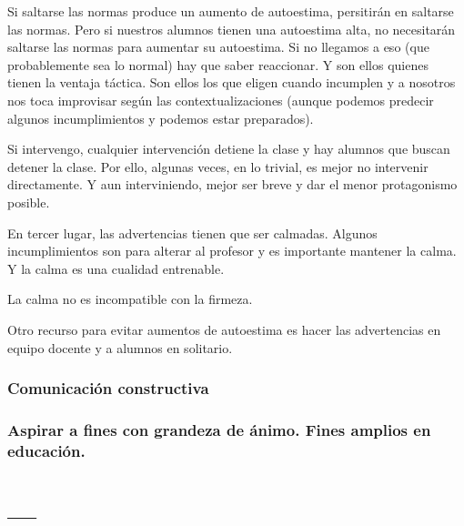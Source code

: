 \documentclass[palatino]{apuntesURJC}
\begin{document}
Si saltarse las normas produce un aumento de autoestima, persitirán en saltarse las normas.
%
Pero si nuestros alumnos tienen una autoestima alta, no necesitarán saltarse las normas para aumentar su autoestima.
%
Si no llegamos a eso (que probablemente sea lo normal) hay que saber reaccionar.
%
Y son ellos quienes tienen la ventaja táctica. Son ellos los que eligen cuando incumplen y a nosotros nos toca improvisar según las contextualizaciones (aunque podemos predecir algunos incumplimientos y podemos estar preparados).

Si intervengo, cualquier intervención detiene la clase y hay alumnos que buscan detener la clase. 
%
Por ello, algunas veces, en lo trivial, es mejor no intervenir directamente.
%
Y aun interviniendo, mejor ser breve y dar el menor protagonismo posible.

En tercer lugar, las advertencias tienen que ser calmadas. 
%
Algunos incumplimientos son para alterar al profesor y es importante mantener la calma. 
%
Y la calma es una cualidad entrenable.

La calma no es incompatible con la firmeza.

Otro recurso para evitar aumentos de autoestima es hacer las advertencias en equipo docente y a alumnos en solitario.



\subsection{Comunicación constructiva}

\subsection{Aspirar a fines con grandeza de ánimo. Fines amplios en educación.}



\appendix

\chapter{---}


\printindex
\end{document}

